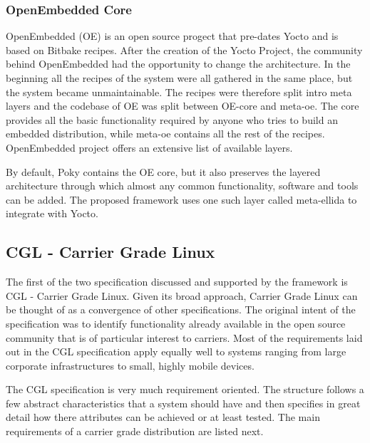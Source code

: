 \subsubsection*{OpenEmbedded Core}
OpenEmbedded (OE) is an open source progect that pre-dates Yocto and is based on Bitbake recipes. After the creation of the Yocto Project, the community behind OpenEmbedded had the opportunity to change the architecture. In the beginning all the recipes of the system were all gathered in the same place, but the system became unmaintainable. The recipes were therefore split intro meta layers and the codebase of OE was split between OE-core and meta-oe. The core provides all the basic functionality required by anyone who tries to build an embedded distribution, while meta-oe contains all the rest of the recipes. OpenEmbedded project offers an extensive list of available layers.

By default, Poky contains the OE core, but it also preserves the layered architecture through which almost any common functionality, software and tools can be added. The proposed framework uses one such layer called meta-ellida to integrate with Yocto.

\subsection{CGL - Carrier Grade Linux}
The first of the two specification discussed and supported by the framework is CGL - Carrier Grade Linux.
Given its broad approach, Carrier Grade Linux can be thought of as a convergence of other specifications. The original intent of the specification was to identify functionality already available in the open source community that is of particular interest to carriers. Most of the requirements laid out in the CGL specification apply equally well to systems ranging from large corporate infrastructures to small, highly mobile devices.

The CGL specification is very much requirement oriented. The structure follows a few abstract characteristics that a system should have and then specifies in great detail how there attributes can be achieved or at least tested. The main requirements of a carrier grade distribution are listed next.

